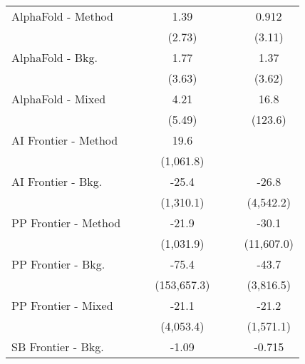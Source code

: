 \begin{tabular}{lcccccc}
   AlphaFold - Method           &               &           & 1.39        &               &           & 0.912\\   
                                &               &           & (2.73)      &               &           & (3.11)\\   
   AlphaFold - Bkg.             &               &           & 1.77        &               &           & 1.37\\   
                                &               &           & (3.63)      &               &           & (3.62)\\   
   AlphaFold - Mixed            &               &           & 4.21        &               &           & 16.8\\   
                                &               &           & (5.49)      &               &           & (123.6)\\   
   AI Frontier - Method         &               &           & 19.6        &               &           &   \\   
                                &               &           & (1,061.8)   &               &           &   \\   
   AI Frontier - Bkg.           &               &           & -25.4       &               &           & -26.8\\   
                                &               &           & (1,310.1)   &               &           & (4,542.2)\\   
   PP Frontier - Method         &               &           & -21.9       &               &           & -30.1\\   
                                &               &           & (1,031.9)   &               &           & (11,607.0)\\   
   PP Frontier - Bkg.           &               &           & -75.4       &               &           & -43.7\\   
                                &               &           & (153,657.3) &               &           & (3,816.5)\\   
   PP Frontier - Mixed          &               &           & -21.1       &               &           & -21.2\\   
                                &               &           & (4,053.4)   &               &           & (1,571.1)\\   
   SB Frontier - Bkg.           &               &           & -1.09       &               &           & -0.715\\   

\end{tabular}
